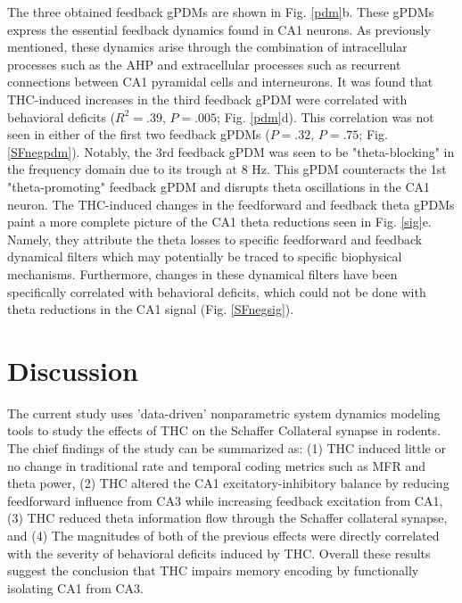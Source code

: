 \documentclass[11pt,a4paper,final]{article}
\begin{document}
The three obtained feedback gPDMs are shown in Fig. \ref{pdm}b.
These gPDMs express the essential feedback dynamics found in CA1 neurons.
As previously mentioned, these dynamics arise through the combination of intracellular processes such as the AHP and extracellular processes such as recurrent connections between CA1 pyramidal cells and interneurons.
It was found that THC-induced increases in the third feedback gPDM were correlated with behavioral deficits ($R^2=.39$, $P=.005$; Fig. \ref{pdm}d).
This correlation was not seen in either of the first two feedback gPDMs ($P=.32$, $P=.75$; Fig. \ref{SFnegpdm}).
Notably, the 3rd feedback gPDM was seen to be "theta-blocking" in the frequency domain due to its trough at 8 Hz. 
This gPDM counteracts the 1st "theta-promoting" feedback gPDM and disrupts theta oscillations in the CA1 neuron.
The THC-induced changes in the feedforward and feedback theta gPDMs paint a more complete picture of the CA1 theta reductions seen in Fig. \ref{sig}e.
Namely, they attribute the theta losses to specific feedforward and feedback dynamical filters which may potentially be traced to specific biophysical mechanisms.
Furthermore, changes in these dynamical filters have been specifically correlated with behavioral deficits, which could not be done with theta reductions in the CA1 signal (Fig. \ref{SFnegsig}).

\section{Discussion \label{disc}}

The current study uses 'data-driven' nonparametric system dynamics modeling tools to study the effects of THC on the Schaffer Collateral synapse in rodents.
The chief findings of the study can be summarized as:
(1) THC induced little or no change in traditional rate and temporal coding metrics such as MFR and theta power, 	
(2) THC altered the CA1 excitatory-inhibitory balance by reducing feedforward influence from CA3 while increasing feedback excitation from CA1,
(3) THC reduced theta information flow through the Schaffer collateral synapse,
and (4) The magnitudes of both of the previous effects were directly correlated with the severity of behavioral deficits induced by THC.
Overall these results suggest the conclusion that THC impairs memory encoding by functionally isolating CA1 from CA3.
\end{document}
